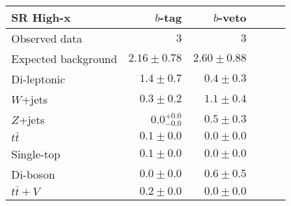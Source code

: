 \begin{tabular*}{\textwidth}{@{\extracolsep{\fill}}lrrrrr}
\toprule
\textbf{SR High-x}  & $b$-tag & $b$-veto &  \\
\midrule

Observed data & $3$ & $3$ \\
\midrule
Expected background & $2.16 \pm 0.78$ & $2.60 \pm 0.88$ \\
\midrule
Di-leptonic & $1.4 \pm 0.7$ & $0.4 \pm 0.3$ \\
$W$+jets & $0.3 \pm 0.2$ & $1.1 \pm 0.4$ \\
$Z$+jets & $0.0_{-0.0}^{+0.0}$ & $0.5 \pm 0.3$ \\
$t\bar{t}$ & $0.1 \pm 0.0$ & $0.0 \pm 0.0$ \\
Single-top & $0.1 \pm 0.0$ & $0.0 \pm 0.0$ \\
Di-boson & $0.0 \pm 0.0$ & $0.6 \pm 0.5$ \\
$t\bar{t}+V$ & $0.2 \pm 0.0$ & $0.0 \pm 0.0$ \\


\bottomrule
\end{tabular*}




